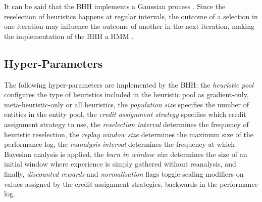 It can be said that the \acs{BHH} implements a Gaussian process \cite{ref:gortler:2019}. Since the reselection of heuristics happens at regular intervals, the outcome of a selection in one iteration may influence the outcome of another in the next iteration, making the implementation of the \acs{BHH} a \acs{HMM} \cite{ref:rabiner:1986}.


\subsection{Hyper-Parameters}\label{sec:bhh:hyper_parameters}

The following hyper-parameters are implemented by the \acs{BHH}: the \textit{heuristic pool} configures the type of heuristics included in the heuristic pool as gradient-only, meta-heuristic-only or all heuristics, the \textit{population size} specifies the number of entities in the entity pool, the \textit{credit assignment strategy} specifies which credit assignment strategy to use, the \textit{reselection interval} determines the frequency of heuristic reselection, the \textit{replay window size} determines the maximum size of the performance log, the \textit{reanalysis interval} determines the frequency at which Bayesian analysis is applied, the \textit{burn in window size} determines the size of an initial window where experience is simply gathered without reanalysis, and finally, \textit{discounted rewards} and \textit{normalisation} flags toggle scaling modifiers on values assigned by the credit assignment strategies, backwards in the performance log.
